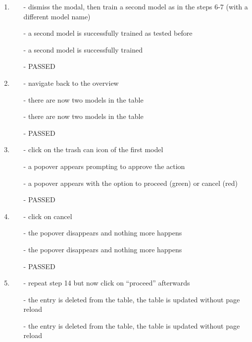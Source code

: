 \begin{description}
\begin{enumerate}
\begin{itemize}
		\end{itemize}
		\item
		\begin{itemize}
			\item [-] dismiss the modal, then train a second model as in the steps 6-7 (with a different model name)
			\item [-] a second model is successfully trained as tested before
			\item [-] a second model is successfully trained
			\item [-] PASSED
		\end{itemize}
		\item
		\begin{itemize}
			\item [-] navigate back to the overview
			\item [-] there are now two models in the table
			\item [-] there are now two models in the table
			\item [-] PASSED
		\end{itemize}
		\item
		\begin{itemize}
			\item [-] click on the trash can icon of the first model
			\item [-] a popover appears prompting to approve the action
			\item [-] a popover appears with the option to proceed (green) or cancel (red)
			\item [-] PASSED
		\end{itemize}
		\item
		\begin{itemize}
			\item [-] click on cancel
			\item [-] the popover disappears and nothing more happens
			\item [-] the popover disappears and nothing more happens
			\item [-] PASSED
		\end{itemize}
		\item
		\begin{itemize}
			\item [-] repeat step 14 but now click on \enquote{proceed} afterwards
			\item [-] the entry is deleted from the table, the table is updated without page reload
			\item [-] the entry is deleted from the table, the table is updated without page reload

\end{itemize}
\end{enumerate}
\end{description}
